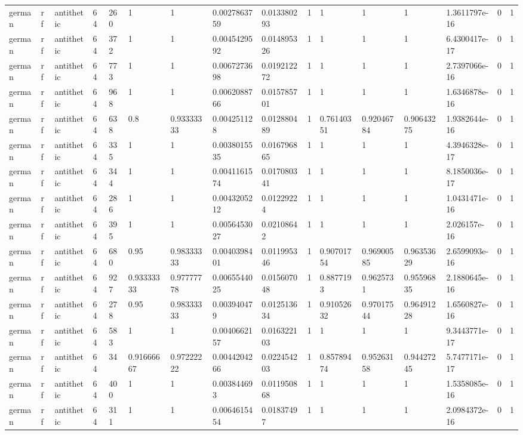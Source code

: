 \begin{tabular}{llllllllllllllll}
german & rf & antithetic & 64 & 260 & 1 & 1 & 0.0027863759 & 0.013380293 & 1 & 1 & 1 & 1 & 1.3611797e-16 & 0 & 1 \\
german & rf & antithetic & 64 & 372 & 1 & 1 & 0.0045429592 & 0.014895326 & 1 & 1 & 1 & 1 & 6.4300417e-17 & 0 & 1 \\
german & rf & antithetic & 64 & 773 & 1 & 1 & 0.0067273698 & 0.019212272 & 1 & 1 & 1 & 1 & 2.7397066e-16 & 0 & 1 \\
german & rf & antithetic & 64 & 968 & 1 & 1 & 0.0062088766 & 0.015785701 & 1 & 1 & 1 & 1 & 1.6346878e-16 & 0 & 1 \\
german & rf & antithetic & 64 & 638 & 0.8 & 0.93333333 & 0.004251128 & 0.012880489 & 1 & 0.76140351 & 0.92046784 & 0.90643275 & 1.9382644e-16 & 0 & 1 \\
german & rf & antithetic & 64 & 335 & 1 & 1 & 0.0038015535 & 0.016796865 & 1 & 1 & 1 & 1 & 4.3946328e-17 & 0 & 1 \\
german & rf & antithetic & 64 & 344 & 1 & 1 & 0.0041161574 & 0.017080341 & 1 & 1 & 1 & 1 & 8.1850036e-17 & 0 & 1 \\
german & rf & antithetic & 64 & 286 & 1 & 1 & 0.0043205212 & 0.01229224 & 1 & 1 & 1 & 1 & 1.0431471e-16 & 0 & 1 \\
german & rf & antithetic & 64 & 395 & 1 & 1 & 0.0056453027 & 0.02108642 & 1 & 1 & 1 & 1 & 2.026157e-16 & 0 & 1 \\
german & rf & antithetic & 64 & 680 & 0.95 & 0.98333333 & 0.0040398401 & 0.011995346 & 1 & 0.90701754 & 0.96900585 & 0.96353629 & 2.6599093e-16 & 0 & 1 \\
german & rf & antithetic & 64 & 927 & 0.93333333 & 0.97777778 & 0.0065544025 & 0.015607048 & 1 & 0.8877193 & 0.9625731 & 0.95596835 & 2.1880645e-16 & 0 & 1 \\
german & rf & antithetic & 64 & 278 & 0.95 & 0.98333333 & 0.003940479 & 0.012513634 & 1 & 0.91052632 & 0.97017544 & 0.96491228 & 1.6560827e-16 & 0 & 1 \\
german & rf & antithetic & 64 & 583 & 1 & 1 & 0.0040662157 & 0.016322103 & 1 & 1 & 1 & 1 & 9.3443771e-17 & 0 & 1 \\
german & rf & antithetic & 64 & 34 & 0.91666667 & 0.97222222 & 0.0044204266 & 0.022454203 & 1 & 0.85789474 & 0.95263158 & 0.94427245 & 5.7477171e-17 & 0 & 1 \\
german & rf & antithetic & 64 & 400 & 1 & 1 & 0.003844693 & 0.011950868 & 1 & 1 & 1 & 1 & 1.5358085e-16 & 0 & 1 \\
german & rf & antithetic & 64 & 311 & 1 & 1 & 0.0064615454 & 0.01837497 & 1 & 1 & 1 & 1 & 2.0984372e-16 & 0 & 1 \\

\end{tabular}
